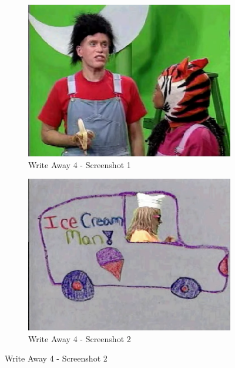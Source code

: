 \begin{figure}[H]
    \centering
    \begin{subfigure}{0.45\textwidth}
        \centering
        \includegraphics[width=\linewidth]{Games/WriteAway/Images/WriteAway4Screenshot1.png}
        \caption{Write Away 4 - Screenshot 1}
    \end{subfigure}
    \begin{subfigure}{0.45\textwidth}
        \centering
        \includegraphics[width=\linewidth]{Games/WriteAway/Images/WriteAway4Screenshot2.png}
        \caption{Write Away 4 - Screenshot 2}
    \end{subfigure}


\end{figure}
